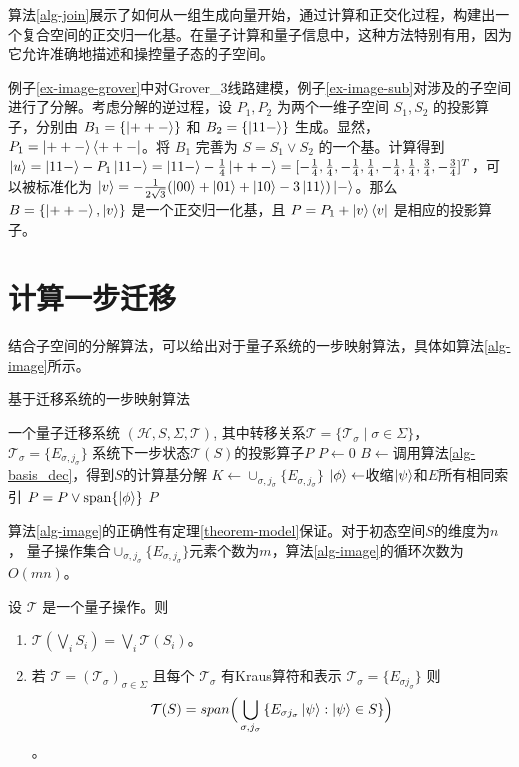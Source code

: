 算法\ref{alg-join}展示了如何从一组生成向量开始，通过计算和正交化过程，构建出一个复合空间的正交归一化基。在量子计算和量子信息中，这种方法特别有用，因为它允许准确地描述和操控量子态的子空间。

\begin{example}
    例子\ref{ex-image-grover}中对Grover\_3线路建模，例子\ref{ex-image-sub}对涉及的子空间进行了分解。考虑分解的逆过程，设 $P_1,P_2$ 为两个一维子空间 $S_1,S_2$ 的投影算子，分别由 $B_1=\{\ket{++-}\}$ 和 $B_2=\{\ket{11-}\}$ 生成。显然，$P_1=\ket{++-}\bra{++-}$。将 $B_1$ 完善为 $S=S_1\vee S_2$ 的一个基。计算得到$\ket{u}=\ket{11-}-P_1\ket{11-}=\ket{11-}-\frac{1}{4}\ket{++-}=[-\frac{1}{4},\frac{1}{4},-\frac{1}{4},\frac{1}{4},-\frac{1}{4},\frac{1}{4},\frac{3}{4},-\frac{3}{4}]^T$，可以被标准化为 $\ket{v}=-\frac{1}{2\sqrt{3}}(\ket{00}+\ket{01}+\ket{10}-3\ket{11})\ket{-}$。那么 $B=\{\ket{++-},\ket{v}\}$ 是一个正交归一化基，且 $P=P_1+\ket{v}\bra{v}$ 是相应的投影算子。
\end{example}
\section{计算一步迁移}
结合子空间的分解算法，可以给出对于量子系统的一步映射算法，具体如算法\ref{alg-image}所示。
\begin{algorithm}
\caption{基于迁移系统的一步映射算法}
\label{alg-image}
\begin{algorithmic}[1] %
\Require 一个量子迁移系统 $(\mathcal{H},S,\Sigma,\mathcal{T})$, 其中转移关系$\mathcal{T}=\{\mathcal{T}_\sigma\mid \sigma\in \Sigma\}$，  $\mathcal{T}_\sigma=\{E_{\sigma,j_\sigma}\}$
\Ensure 系统下一步状态$\mathcal{T}(S)$的投影算子$P$
\State $P \gets 0$ 
\State $B \gets $调用算法\ref{alg-basis_dec}，得到$S$的计算基分解
\State $K \gets \cup_{\sigma,j_\sigma}\{E_{\sigma,j_\sigma}\}$
    \State $\ket{\phi} \gets $收缩\(\ket{\psi}\)和\(E\)所有相同索引
    \State $P=P \vee \text{span}\{\ket{\phi}\}$
\EndFor
\State \Return $P$ 
\end{algorithmic}
\end{algorithm}
算法\ref{alg-image}的正确性有定理\ref{theorem-model}保证。对于初态空间$S$的维度为$n$， 量子操作集合$\cup_{\sigma,j_\sigma}\{E_{\sigma,j_\sigma}\}$元素个数为$m$，算法\ref{alg-image}的循环次数为$O(mn)$。
\begin{theorem}\citep{2021}
    \label{theorem-model}
    设 $\mathcal{T}$ 是一个量子操作。则
\begin{enumerate}
    \item $\mathcal{T}(\bigvee_{i}{S_i})=\bigvee_{i}{\mathcal{T}(S_i)}$。
    \item 若 $\mathcal{T}=(\mathcal{T}_\sigma)_{\sigma \in \Sigma}$ 且每个 $\mathcal{T}_{\sigma}$ 有Kraus算符和表示 $\mathcal{T}_{\sigma}= \{ E_{\sigma j_\sigma} \}$
则
$$\mathcal{T}(S)=span\Big(\bigcup_{\sigma,j_\sigma}{\{E_{\sigma j_\sigma}\ket{\psi}:\ket{\psi}\in S\}}\Big)$$。
\end{enumerate}
\end{theorem}

